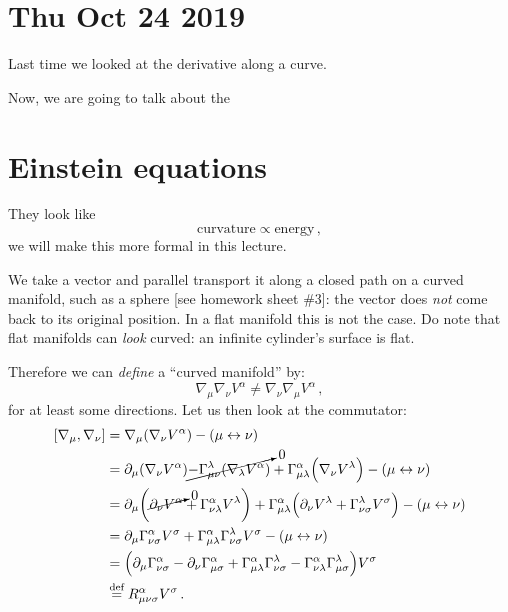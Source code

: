 \documentclass[main.tex]{subfiles}
\begin{document}
\section*{Thu Oct 24 2019}

Last time we looked at the derivative along a curve.

Now, we are going to talk about the

\section{Einstein equations}

They look like 
%
\begin{equation}
  \text{curvature} \propto \text{energy}
\,,
\end{equation}
%
we will make this more formal in this lecture.

We take a vector and parallel transport it along a closed path on a curved manifold, such as a sphere [see homework sheet \#3]: the vector does \emph{not} come back to its original position.
In a flat manifold this is not the case.
Do note that flat manifolds can \emph{look} curved: an infinite cylinder's surface is flat.

Therefore we can \emph{define} a ``curved manifold'' by: 
%
\begin{equation}
  \nabla_{\mu } \nabla_{\nu } V^{\alpha } \neq \nabla_{\nu } \nabla_{\mu } V^{\alpha }
\,,
\end{equation}
%
for at least some directions. Let us then look at the commutator: 
%
\begin{subequations}
\begin{align}
  [\nabla_{\mu }, \nabla_{\nu }] &= \nabla_{\mu }\qty(\nabla_{\nu } V^{\alpha }) - (\mu \leftrightarrow \nu )  \\
  &= \partial_{\mu } \qty(\nabla_{\nu } V^{\alpha })
  \cancelto{0}{- \Gamma_{\mu \nu }^{\lambda } \qty(\nabla_{\lambda }V^{\alpha })}
  + \Gamma_{\mu \lambda }^{\alpha }\qty(\nabla_{\nu} V^{\lambda }) - (\mu \leftrightarrow \nu )  \\
  &= \partial_{\mu } \qty(\cancelto{0}{\partial_{\nu } V^{\alpha }} + \Gamma_{\nu \lambda }^{\alpha }V^{\lambda })
  + \Gamma_{\mu \lambda }^{\alpha }\qty(\partial_{\nu } V^{\lambda  } + \Gamma_{\nu \sigma  }^{\lambda }V^{\sigma  }) - (\mu \leftrightarrow \nu )  \\
  &= \partial_{\mu } \Gamma_{\nu \sigma  }^{\alpha }V^{\sigma  }
  + \Gamma_{\mu \lambda }^{ \alpha }\Gamma_{\nu \sigma  }^{ \lambda   } V^{\sigma }- (\mu \leftrightarrow \nu )  \\
  &= \qty(
    \partial_{\mu } \Gamma_{\nu \sigma  }^{\alpha }
       - \partial_{\nu } \Gamma_{\mu \sigma  }^{\alpha }
      + \Gamma_{\mu \lambda }^{ \alpha }\Gamma_{\nu \sigma  }^{ \lambda }
      - \Gamma_{\nu \lambda }^{ \alpha }\Gamma_{\mu \sigma  }^{ \lambda }
      )V^{\sigma }  \\
  &\overset{\text{def}}{=} R^{\alpha }_{\mu \nu \sigma }V^{\sigma }
\,.
\end{align}
\end{subequations}
%
\end{document}
